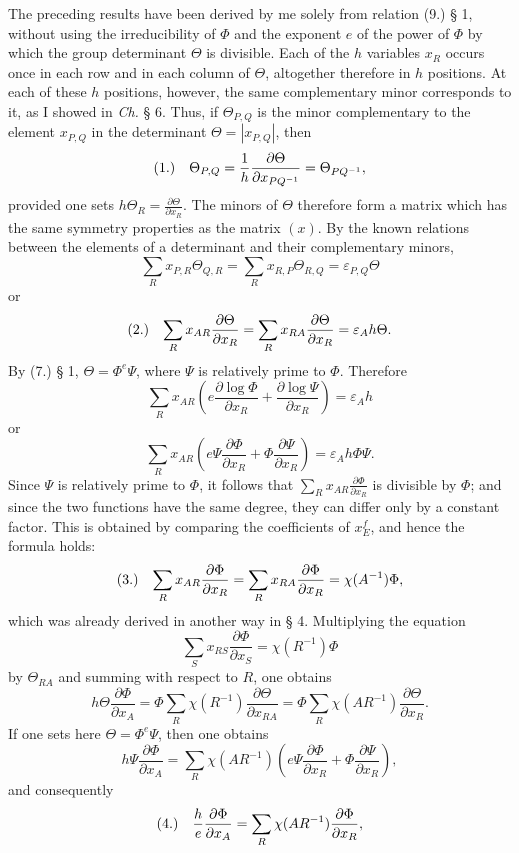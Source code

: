 \documentclass[11pt]{article}
\makeatletter
\newcommand{\frobtagc}[2]{\[\begin{array}{@{}r@{\quad}c@{}}\textup{(#1)} & \displaystyle #2\end{array}\]}
\makeatother
\begin{document}
The preceding results have been derived by me solely from relation (9.) § 1, without using the irreducibility of $\Phi$ and the exponent $e$ of the power of $\Phi$ by which the group determinant $\Theta$ is divisible. Each of the $h$ variables $x_R$ occurs once in each row and in each column of $\Theta$, altogether therefore in $h$ positions. At each of these $h$ positions, however, the same complementary minor corresponds to it, as I showed in \emph{Ch.} § 6. Thus, if $\Theta_{P,Q}$ is the minor complementary to the element $x_{P,Q}$ in the determinant $\Theta=|x_{P,Q}|$, then
\frobtagc{1.}{\Theta_{P,Q}=\frac{1}{h}\frac{\partial\Theta}{\partial x_{PQ^{-1}}}=\Theta_{PQ^{-1}},}
provided one sets $h\Theta_R=\frac{\partial\Theta}{\partial x_R}$. The minors of $\Theta$ therefore form a matrix which has the same symmetry properties as the matrix $(x)$. By the known relations between the elements of a determinant and their complementary minors,
\[
\sum_R x_{P,R}\Theta_{Q,R}=\sum_R x_{R,P}\Theta_{R,Q}=\varepsilon_{P,Q}\Theta
\]
or
\frobtagc{2.}{\sum_R x_{AR}\frac{\partial\Theta}{\partial x_R}=\sum_R x_{RA}\frac{\partial\Theta}{\partial x_R}=\varepsilon_A h\Theta.}
By (7.) § 1, $\Theta=\Phi^e\Psi$, where $\Psi$ is relatively prime to $\Phi$. Therefore
\[
\sum_R x_{AR}\left(e\frac{\partial\log\Phi}{\partial x_R}+\frac{\partial\log\Psi}{\partial x_R}\right)=\varepsilon_A h
\]
or
\[
\sum_R x_{AR}\left(e\Psi\frac{\partial\Phi}{\partial x_R}+\Phi\frac{\partial\Psi}{\partial x_R}\right)=\varepsilon_A h\Phi\Psi.
\]
Since $\Psi$ is relatively prime to $\Phi$, it follows that $\sum_Rx_{AR}\frac{\partial\Phi}{\partial x_R}$ is divisible by $\Phi$; and since the two functions have the same degree, they can differ only by a constant factor. This is obtained by comparing the coefficients of $x_E^f$, and hence the formula holds:
\frobtagc{3.}{\sum_R x_{AR}\frac{\partial\Phi}{\partial x_R}=\sum_R x_{RA}\frac{\partial\Phi}{\partial x_R}=\chi(A^{-1})\Phi,}
which was already derived in another way in § 4. Multiplying the equation
\[
\sum_S x_{RS}\frac{\partial\Phi}{\partial x_S}=\chi(R^{-1})\Phi
\]
by $\Theta_{RA}$ and summing with respect to $R$, one obtains
\[
h\Theta\frac{\partial\Phi}{\partial x_A}=\Phi\sum_R\chi(R^{-1})\frac{\partial\Theta}{\partial x_{RA}}=\Phi\sum_R\chi(AR^{-1})\frac{\partial\Theta}{\partial x_R}.
\]
If one sets here $\Theta=\Phi^e\Psi$, then one obtains
\[
h\Psi\frac{\partial\Phi}{\partial x_A}=\sum_R\chi(AR^{-1})\left(e\Psi\frac{\partial\Phi}{\partial x_R}+\Phi\frac{\partial\Psi}{\partial x_R}\right),
\]
and consequently
\frobtagc{4.}{\frac{h}{e}\frac{\partial\Phi}{\partial x_A}=\sum_R\chi(AR^{-1})\frac{\partial\Phi}{\partial x_R},}
\end{document}
